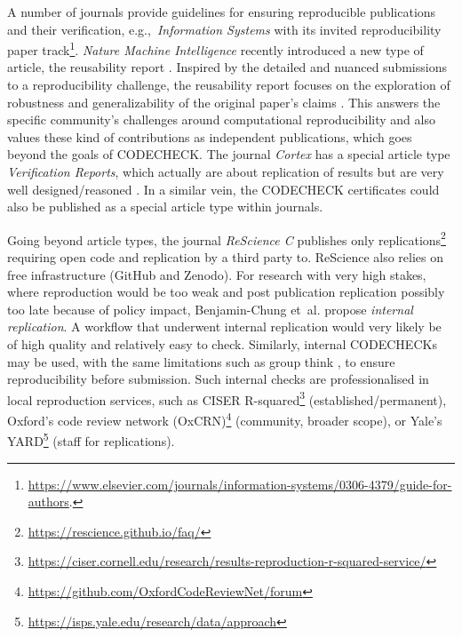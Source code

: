 \documentclass[12pt]{article}
\begin{document}
A number of journals provide guidelines for 
ensuring reproducible publications and their verification,
e.g.,~\emph{Information Systems} with its invited 
reproducibility paper track\footnote{
\url{https://www.elsevier.com/journals/information-systems/0306-4379/guide-for-authors}.}.
\emph{Nature Machine Intelligence} recently introduced a new type of article,
the reusability report \cite{noauthor_research_2020}.
Inspired by the detailed and nuanced submissions to a reproducibility 
challenge, the reusability report focuses on the exploration of robustness
and generalizability of the original paper's claims
\cite{noauthor_research_2020}. This answers the specific community's 
challenges around computational reproducibility and also values these kind
of contributions as independent publications, which goes beyond the goals 
of CODECHECK.
The journal \emph{Cortex} has a special article type 
\emph{Verification Reports}, which  actually are about replication of results 
but are very well designed/reasoned \cite{chambers_verification_2020}.
In a similar vein, the CODECHECK certificates
could also be published as a special article type within journals.

Going beyond article types, the journal \emph{ReScience C} publishes only
replications\footnote{\url{https://rescience.github.io/faq/}} requiring
open code and replication by a third party to. ReScience also relies on
free infrastructure (GitHub and Zenodo).
For research with very high stakes, where reproduction would be too weak and
post publication replication possibly too late because of policy impact,
Benjamin-Chung et~al. \cite{benjamin-chung_internal_2020} propose
\emph{internal replication}.
A workflow that underwent internal
replication would very likely be of high quality and relatively easy to check.
Similarly, internal CODECHECKs may be used, with the same limitations such
as group think \cite{benjamin-chung_internal_2020},
to ensure reproducibility before submission.
Such internal checks are professionalised in local reproduction services,
such as CISER R-squared\footnote{
\url{https://ciser.cornell.edu/research/results-reproduction-r-squared-service/}} (established/permanent),
Oxford's code review network (OxCRN)\footnote{
\url{https://github.com/OxfordCodeReviewNet/forum}} (community, broader scope), or
Yale's YARD\footnote{
\url{https://isps.yale.edu/research/data/approach}} (staff for replications).
\end{document}
